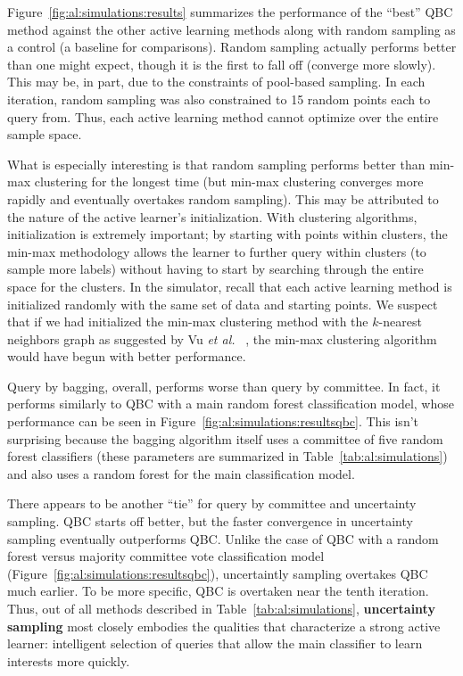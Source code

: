 Figure~\ref{fig:al:simulations:results} summarizes the performance of the 
``best'' QBC method against the other active learning methods along with random 
sampling as a control (a baseline for comparisons). Random sampling actually 
performs better than one might expect, though it is the first to fall off 
(converge more slowly). This may be, in part, due to the constraints of 
pool-based sampling. In each iteration, random sampling was also constrained to 
15 random points each to query from. Thus, each active learning method cannot 
optimize over the entire sample space.

What is especially interesting is that random 
sampling performs better than min-max clustering for the longest time (but 
min-max clustering converges more rapidly and eventually overtakes random 
sampling). This may be attributed to the nature of the active learner's 
initialization. With clustering algorithms, initialization is extremely 
important; by starting with points within clusters, the min-max methodology 
allows the learner to further query within clusters (to sample more labels) 
without having to start by searching through the entire space for the clusters. 
In the simulator, recall that each active learning method is initialized 
randomly with the same set of data and starting points. We suspect that if we 
had initialized the min-max clustering method with the $k$-nearest neighbors 
graph as suggested by Vu \textit{et al.}  ~\cite{vu2010}, the min-max 
clustering algorithm would have begun with better performance. 

Query by bagging, overall, performs worse than query by committee. In fact, it 
performs similarly to QBC with a main random forest classification model, whose 
performance can be seen in Figure~\ref{fig:al:simulations:resultsqbc}. 
This isn't surprising because the bagging algorithm itself uses a committee of 
five random forest classifiers (these parameters are summarized in 
Table~\ref{tab:al:simulations}) and also uses a random forest 
for the main classification model. 

There appears to be another ``tie'' for query by committee and uncertainty 
sampling. QBC starts off better, but the faster convergence in uncertainty 
sampling eventually outperforms QBC. Unlike the case of QBC with a random 
forest versus majority committee vote classification model 
(Figure~\ref{fig:al:simulations:resultsqbc}), uncertaintly sampling overtakes 
QBC much earlier. To be more specific, QBC is overtaken near the tenth 
iteration. Thus, out of all methods described in 
Table~\ref{tab:al:simulations}, \textbf{uncertainty sampling} most closely 
embodies the qualities that characterize a strong active learner: intelligent 
selection of queries that allow the main classifier to learn interests more 
quickly.

